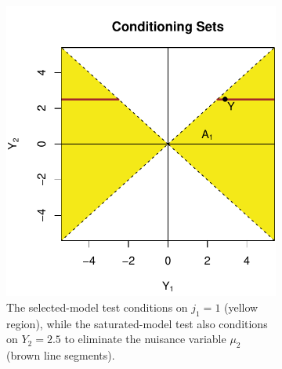 \documentclass{article}
\begin{document}
\begin{figure}
  \centering
  \begin{subfigure}[t]{.4\textwidth}
    \includegraphics[width=\textwidth]{figs/bivariateSelVSat_condSets.pdf}
    \caption{The selected-model test conditions on $j_1=1$ (yellow region), while the saturated-model test also conditions on $Y_2=2.5$ to eliminate the nuisance variable $\mu_2$ (brown line segments).}
    \label{fig:bv_condSets}
  \end{subfigure}
  \hspace{.1\textwidth}
  \begin{subfigure}[t]{.4\textwidth}

\end{subfigure}
\end{figure}
\end{document}

